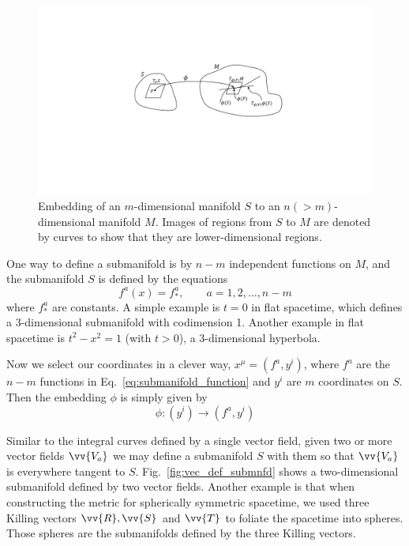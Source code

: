 \documentclass[11pt,table]{article}
\begin{document}
\begin{figure}
\centering
\includegraphics[width=0.9\linewidth]{submanifold.pdf}
\caption{Embedding of an $m$-dimensional manifold $S$ to an $n(>m)$-dimensional manifold $M$. Images of regions from $S$ to $M$ are denoted by curves to show that they are lower-dimensional regions.} \label{fig:submanifold}
\end{figure}

One way to define a submanifold is by $n-m$ independent functions on $M$, and the submanifold $S$ is defined by the equations
\begin{equation} \label{eq:submanifold_function}
f^a(x) = f_*^a, \qquad a=1,2,\dots,n-m
\end{equation}
where $f_*^a$ are constants. A simple example is $t=0$ in flat spacetime, which defines a 3-dimensional submanifold with codimension 1. Another example in flat spacetime is $t^2-x^2=1$ (with $t>0$), a 3-dimensional hyperbola.

Now we select our coordinates in a clever way, $x^{\mu} = (f^a,y^i)$, where $f^a$ are the $n-m$ functions in Eq.~\eqref{eq:submanifold_function} and $y^i$ are $m$ coordinates on $S$. Then the embedding $\phi$ is simply given by
\begin{equation}
\phi: (y^i) \to (f^a,y^i)
\end{equation}

Similar to the integral curves defined by a single vector field, given two or more vector fields $\vv{V_a}$ we may define a submanifold $S$ with them so that $\vv{V_a}$ is everywhere tangent to $S$. Fig.~\ref{fig:vec_def_submnfd} shows a two-dimensional submanifold defined by two vector fields. Another example is that when constructing the metric for spherically symmetric spacetime, we used three Killing vectors $\vv{R},\vv{S}$ and $\vv{T}$ to foliate the spacetime into spheres. Those spheres are the submanifolds defined by the three Killing vectors.
\end{document}
